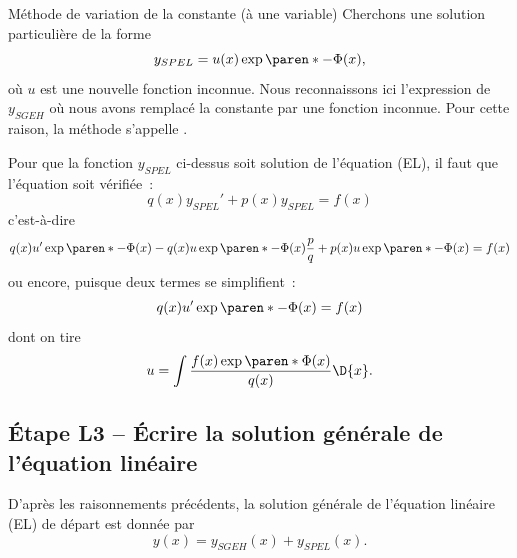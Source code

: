 \begin{frame}{Méthode de variation de la constante (à une variable)}
  Cherchons une solution particulière de la forme
  \begin{equation*}
    y_{SPEL} = u(x) \exp{\paren*{-\Phi(x)}},
  \end{equation*}\pause{}
  où \(u\) est une nouvelle fonction inconnue.\pause{} Nous reconnaissons ici l'expression de \(y_{SGEH}\) où nous avons remplacé la constante par une fonction inconnue.\pause{} Pour cette raison, la méthode s'appelle .\pause{}

  Pour que la fonction \(y_{SPEL}\) ci-dessus soit solution de l'équation (EL),\pause{} il faut que l'équation soit vérifiée~:\pause{}
  \begin{equation*}
    q(x) y_{SPEL}' + p(x) y_{SPEL} = f(x)
  \end{equation*}\pause{}
  c'est-à-dire
  \begin{equation*}
    q(x) u' \exp{\paren*{-\Phi(x)}} - q(x) u \exp{\paren*{-\Phi(x)}} \frac{p}{q} + p(x) u \exp{\paren*{-\Phi(x)}} = f(x)
  \end{equation*}\pause{}
  ou encore, puisque deux termes se simplifient~:
  \begin{equation*}
    q(x) u' \exp{\paren*{-\Phi(x)}} = f(x)
  \end{equation*}\pause{}
  dont on tire
  \begin{equation*}
    u = \int \frac{f(x) \exp{\paren*{\Phi(x)}}}{q(x)} \D{x}.
  \end{equation*}
\end{frame}
\subsection{Étape L3 -- Écrire la solution générale de l'équation linéaire}
\begin{frame}
  D'après les raisonnements précédents, la solution générale de l'équation linéaire (EL) de départ est donnée par\pause{}
  \begin{equation*}
    y(x) = y_{SGEH}(x) + y_{SPEL}(x).
  \end{equation*}
\end{frame}
